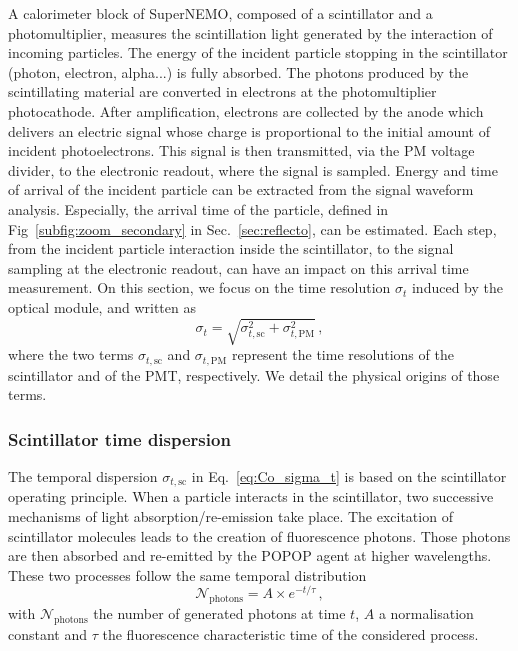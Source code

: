 A calorimeter block of SuperNEMO, composed of a scintillator and a photomultiplier, measures the scintillation light generated by the interaction of incoming particles.
The energy of the incident particle stopping in the scintillator (photon, electron, alpha...) is fully absorbed.
The photons produced by the scintillating material are converted in electrons at the photomultiplier photocathode.
After amplification, electrons are collected by the anode which delivers an electric signal whose charge is proportional to the initial amount of incident photoelectrons.
This signal is then transmitted, via the PM voltage divider, to the electronic readout, where the signal is sampled.
Energy and time of arrival of the incident particle can be extracted from the signal waveform analysis.
Especially, the arrival time of the particle, defined in Fig~\ref{subfig:zoom_secondary} in Sec.~\ref{sec:reflecto}, can be estimated.
Each step, from the incident particle interaction inside the scintillator, to the signal sampling at the electronic readout, can have an impact on this arrival time measurement.
On this section, we focus on the time resolution $\sigma_{t}$ induced by the optical module, and written as
\begin{equation}
  \sigma_{t}=\sqrt{\sigma_{t,\text{sc}}^{2}+\sigma_{t,\text{PM}}^{2}}\,,
  \label{eq:Co_sigma_t}
\end{equation}
where the two terms $\sigma_{t,\text{sc}}$ and $\sigma_{t,\text{PM}}$ represent the time resolutions of the scintillator and of the PMT, respectively.
We detail the physical origins of those terms.

\subsubsection*{Scintillator time dispersion}
The temporal dispersion $\sigma_{t,\text{sc}}$ in Eq.~\eqref{eq:Co_sigma_t} is based on the  scintillator operating principle.
When a particle interacts in the scintillator, two successive mechanisms of light absorption/re-emission take place.
The excitation of scintillator molecules leads to the creation of fluorescence photons.
Those photons are then absorbed and re-emitted by the POPOP agent at higher wavelengths.
These two processes follow the same temporal distribution
\begin{equation}
\mathcal{N}_{\text{photons}} = A\times e^{-t/\tau}\,,
\label{eq:fluorescence_photons_time}
\end{equation}
with $\mathcal{N}_{\text{photons}}$ the number of generated photons at time $t$, $A$ a normalisation constant and $\tau$ the fluorescence characteristic time of the considered process.

